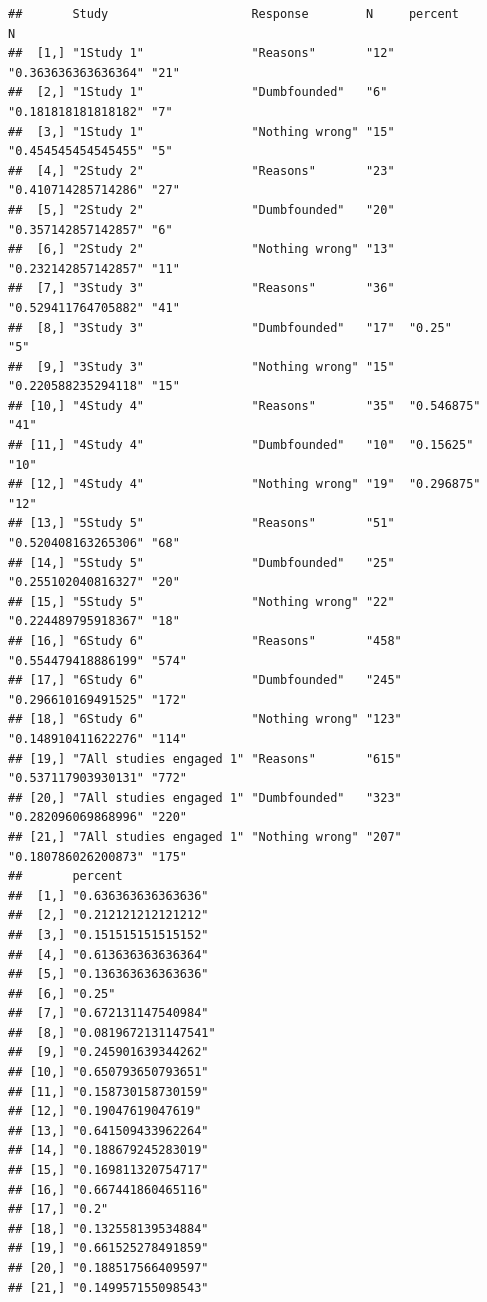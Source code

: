 \documentclass[
  american,
  man,floatsintext]{apa7}
\begin{document}
\begin{verbatim}
##       Study                    Response        N     percent             N    
##  [1,] "1Study 1"               "Reasons"       "12"  "0.363636363636364" "21" 
##  [2,] "1Study 1"               "Dumbfounded"   "6"   "0.181818181818182" "7"  
##  [3,] "1Study 1"               "Nothing wrong" "15"  "0.454545454545455" "5"  
##  [4,] "2Study 2"               "Reasons"       "23"  "0.410714285714286" "27" 
##  [5,] "2Study 2"               "Dumbfounded"   "20"  "0.357142857142857" "6"  
##  [6,] "2Study 2"               "Nothing wrong" "13"  "0.232142857142857" "11" 
##  [7,] "3Study 3"               "Reasons"       "36"  "0.529411764705882" "41" 
##  [8,] "3Study 3"               "Dumbfounded"   "17"  "0.25"              "5"  
##  [9,] "3Study 3"               "Nothing wrong" "15"  "0.220588235294118" "15" 
## [10,] "4Study 4"               "Reasons"       "35"  "0.546875"          "41" 
## [11,] "4Study 4"               "Dumbfounded"   "10"  "0.15625"           "10" 
## [12,] "4Study 4"               "Nothing wrong" "19"  "0.296875"          "12" 
## [13,] "5Study 5"               "Reasons"       "51"  "0.520408163265306" "68" 
## [14,] "5Study 5"               "Dumbfounded"   "25"  "0.255102040816327" "20" 
## [15,] "5Study 5"               "Nothing wrong" "22"  "0.224489795918367" "18" 
## [16,] "6Study 6"               "Reasons"       "458" "0.554479418886199" "574"
## [17,] "6Study 6"               "Dumbfounded"   "245" "0.296610169491525" "172"
## [18,] "6Study 6"               "Nothing wrong" "123" "0.148910411622276" "114"
## [19,] "7All studies engaged 1" "Reasons"       "615" "0.537117903930131" "772"
## [20,] "7All studies engaged 1" "Dumbfounded"   "323" "0.282096069868996" "220"
## [21,] "7All studies engaged 1" "Nothing wrong" "207" "0.180786026200873" "175"
##       percent             
##  [1,] "0.636363636363636" 
##  [2,] "0.212121212121212" 
##  [3,] "0.151515151515152" 
##  [4,] "0.613636363636364" 
##  [5,] "0.136363636363636" 
##  [6,] "0.25"              
##  [7,] "0.672131147540984" 
##  [8,] "0.0819672131147541"
##  [9,] "0.245901639344262" 
## [10,] "0.650793650793651" 
## [11,] "0.158730158730159" 
## [12,] "0.19047619047619"  
## [13,] "0.641509433962264" 
## [14,] "0.188679245283019" 
## [15,] "0.169811320754717" 
## [16,] "0.667441860465116" 
## [17,] "0.2"               
## [18,] "0.132558139534884" 
## [19,] "0.661525278491859" 
## [20,] "0.188517566409597" 
## [21,] "0.149957155098543"
\end{verbatim}
\end{document}
